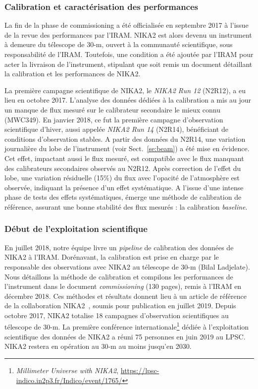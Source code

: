 \subsubsection{Calibration et caractérisation des performances}
La fin de la phase de commissioning a été officialisée en septembre
2017 à l'issue de la revue des performances par l'IRAM. NIKA2 est
alors devenu un instrument à demeure du télescope de 30-m, ouvert à la
communauté scientifique, sous responsabilité de
l'IRAM. Toutefois, une condition a été ajoutée par l'IRAM pour acter
la livraison de l'instrument, stipulant que soit remis un document
détaillant la calibration et les performances de NIKA2.  

La première campagne scientifique de NIKA2, le \emph{NIKA2 Run 12}
(N2R12), a eu lieu en octobre 2017. L'analyse des données dédiées à la
calibration a mis au jour un manque de flux mesuré sur le calibrateur
secondaire le mieux connu (MWC349). En janvier 2018, ce fut la première
campagne d'observation scientifique d'hiver, aussi appelée \emph{NIKA2
Run 14} (N2R14), bénéficiant de conditions d'observation
stables. A partir des données du N2R14, une variation
journalière du lobe de l'instrument (voir Sect.~\ref{se:beam}) a été
mise en évidence. Cet effet, impactant aussi le flux mesuré, est
compatible avec le flux manquant des calibrateurs secondaires observés
au N2R12. Après correction de l'effet du lobe, une variation
résiduelle (15\%) du flux avec l'opacité de l'atmosphère est observée,
indiquant la présence d'un effet systématique. A l'issue d'une intense
phase de tests des effets systématiques, émerge une méthode de
calibration de référence, assurant une bonne stabilité des flux
mesurés : la calibration \emph{baseline}.

\subsubsection{Début de l'exploitation scientifique}
En juillet 2018, notre équipe livre un \emph{pipeline} de calibration
des données de NIKA2 à l'IRAM. Dorénavant, la calibration est prise en
charge par le responsable des observations avec NIKA2 au télescope de
30-m (Bilal Ladjelate). Nous détaillons la méthode de calibration et
compilons les performances de l'instrument dans le document
\emph{commissioning} (130 pages), remis à l'IRAM en décembre 2018. Ces
méthodes et résultats donnent lieu à un article de référence de
la collaboration NIKA2~\citep{Perotto2019}, soumis pour publication en
juillet 2019. Depuis octobre 2017, NIKA2 totalise 18 campagnes
d'observation scientifiques au télescope de 30-m. La première
conférence internationale\footnote{\emph{Millimeter Universe with NIKA2},
  \url{https://lpsc-indico.in2p3.fr/Indico/event/1765/}} dédiée à
l'exploitation scientifique des données de NIKA2 a réuni 75 personnes
en juin 2019 au LPSC. NIKA2 restera en opération au 30-m au
moins jusqu'en 2030.


